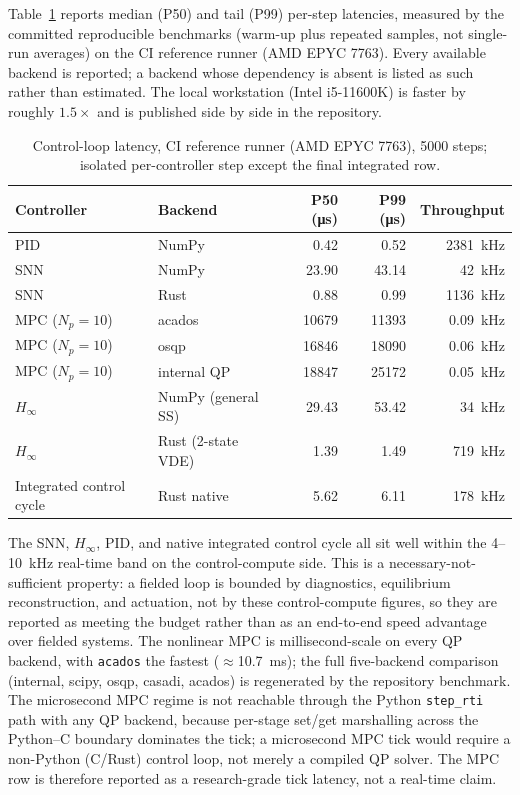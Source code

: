 \documentclass[twocolumn,preprintnumbers,amsmath,amssymb,prl,floatfix]{revtex4-2}
\begin{document}
Table~\ref{tab:timing} reports median (P50) and tail (P99) per-step latencies,
measured by the committed reproducible benchmarks (warm-up plus repeated samples,
not single-run averages) on the CI reference runner (AMD EPYC 7763). Every
available backend is reported; a backend whose dependency is absent is listed as
such rather than estimated. The local workstation (Intel i5-11600K) is faster by
roughly $1.5\times$ and is published side by side in the repository.

\begin{table}[tb]
\centering
\caption{Control-loop latency, CI reference runner (AMD EPYC 7763), 5000 steps;
isolated per-controller step except the final integrated row.}
\label{tab:timing}
\begin{tabular}{llrrr}
\toprule
Controller & Backend & P50 (\si{\micro\second}) & P99 (\si{\micro\second})
  & Throughput \\
\midrule
PID          & NumPy & 0.42  & 0.52  & 2381~kHz \\
SNN          & NumPy & 23.90 & 43.14 & 42~kHz  \\
SNN          & Rust  & 0.88  & 0.99  & 1136~kHz \\
MPC ($N_p{=}10$) & acados & 10679 & 11393 & 0.09~kHz \\
MPC ($N_p{=}10$) & osqp & 16846 & 18090 & 0.06~kHz \\
MPC ($N_p{=}10$) & internal QP & 18847 & 25172 & 0.05~kHz \\
$H_\infty$   & NumPy (general SS) & 29.43 & 53.42 & 34~kHz \\
$H_\infty$   & Rust (2-state VDE) & 1.39 & 1.49 & 719~kHz \\
\midrule
Integrated control cycle & Rust native & 5.62 & 6.11 & 178~kHz \\
\bottomrule
\end{tabular}
\end{table}

The SNN, $H_\infty$, PID, and native integrated control cycle all sit well within
the 4--10~kHz real-time band on the control-compute side. This is a
necessary-not-sufficient property: a fielded loop is bounded by diagnostics,
equilibrium reconstruction, and actuation, not by these control-compute figures,
so they are reported as meeting the budget rather than as an end-to-end speed
advantage over fielded systems.
The nonlinear MPC is millisecond-scale on every QP backend, with \texttt{acados}
the fastest ($\approx$\SI{10.7}{\milli\second}); the full five-backend comparison
(internal, scipy, osqp, casadi, acados) is regenerated by the repository
benchmark. The microsecond MPC regime is not reachable through the Python
\texttt{step\_rti} path with any QP backend, because per-stage set/get marshalling
across the Python--C boundary dominates the tick; a microsecond MPC tick would
require a non-Python (C/Rust) control loop, not merely a compiled QP solver. The
MPC row is therefore reported as a research-grade tick latency, not a real-time
claim.
\end{document}
